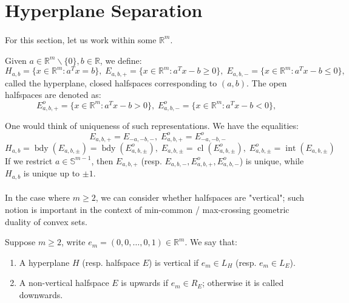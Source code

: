 \section{Hyperplane Separation}
\label{sect:015}
\paragraph{}For this section, let us work within some $\mathbb{R}^m$.

\begin{defn}\label{defn:015-hyperplanes-halfspaces}
	Given $a\in \mathbb{R}^{m}\smallsetminus \{0\},b\in \mathbb{R}$, we define:
	\[
		H_{a,b}=\{x\in \mathbb{R}^m:a^Tx=b\},\;
		E_{a,b,+}=\{x\in \mathbb{R}^m:a^Tx-b\geq 0\},\;
		E_{a,b,-}=\{x\in \mathbb{R}^m:a^Tx-b\leq 0\},\;
	\]
	called the hyperplane, closed halfspaces corresponding to $(a,b)$. The open halfspaces are denoted as:
	\[
		E_{a,b,+}^o=\{x\in \mathbb{R}^m:a^Tx-b> 0\},\;
		E_{a,b,-}^o=\{x\in \mathbb{R}^m:a^Tx-b< 0\},\;
	\]
\end{defn}

\begin{rmrk}
	One would think of uniqueness of such representations. We have the equalities:
	\[
		E_{a,b,+}=E_{-a,-b,-},\;E^o_{a,b,+}=E^o_{-a,-b,-}
	\]
	\[
		H_{a,b}=\operatorname{bdy}(E_{a,b,\pm})=\operatorname{bdy}(E_{a,b,\pm}^o),\;
		E_{a,b,\pm}=\operatorname{cl}(E_{a,b,\pm}^o),\;
		E^o_{a,b,\pm}=\operatorname{int}(E_{a,b,\pm})
	\]
	If we restrict $a\in \mathbb{S}^{m-1}$, then $E_{a,b,+}$ (resp. $E_{a,b,-},E_{a,b,+}^o,E_{a,b,-}^o$) is unique, while $H_{a,b}$ is unique up to $\pm 1$.
\end{rmrk}

\paragraph{}In the case where $m\geq 2$, we can consider whether halfspaces are "vertical"; such notion is important in the context of min-common / max-crossing geometric duality of convex sets.

\begin{defn}\label{defn:015-verticality}
	Suppose $m\geq 2$, write $e_m=(0,0,\dotsc,0,1)\in \mathbb{R}^m$. We say that:
	\begin{enumerate}[label=(\alph*)]
		\item A hyperplane $H$ (resp. halfspace $E$) is vertical if $e_m\in L_H$ (resp. $e_m\in L_E$).
		\item A non-vertical halfspace $E$ is upwards if $e_m\in R_E$; otherwise it is called downwards.
	\end{enumerate}
\end{defn}

